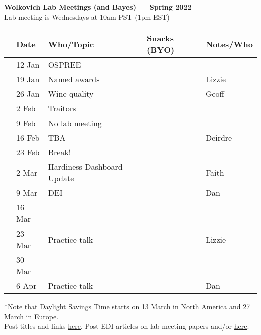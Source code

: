 \documentclass[11pt]{article}
\begin{document}
 
\raggedright
{}

\begin{center} 
{\large \textbf{Wolkovich Lab Meetings (and Bayes) --- Spring 2022}} \\ [2pt]
Lab meeting is Wednesdays at 10am PST (1pm EST) \\ %
\end{center} 

\begin{center}
\begin{tabular}{ p{0.2 cm}  p{2 cm}  p{4.5 cm}  p{3 cm}  p{3.5 cm} }  \hline \hline
 & \textbf{Date}
   & \textbf{Who/Topic}
      & \textbf{Snacks (BYO)} 
         & \textbf{Notes/Who} \\ 
\hline \hline
 &12  Jan & OSPREE &       & \\\hline
 & 19  Jan & Named awards & & Lizzie\\\hline
 & 26 Jan & Wine quality &       & Geoff\\\hline  
 & 2 Feb & Traitors &       &  \\\hline
 & 9 Feb &  No lab meeting &     &  \\\hline 
 & 16 Feb & TBA &     &Deirdre    \\\hline
 & \sout{23 Feb} & Break! &    & \\\hline
 & 2 Mar &   Hardiness Dashboard Update &     &Faith   \\\hline 
 & 9 Mar & DEI  &    & Dan  \\\hline 
 & 16 Mar &  &    &  \\\hline 
 & 23 Mar & Practice talk  &    & Lizzie \\\hline 
 & 30 Mar &  &    &  \\\hline 
 & 6 Apr & Practice talk  &    & Dan \\\hline 

\hline
\end{tabular}
\end{center}
*Note that Daylight Savings Time starts on 13 March in North America and 27 March in Europe.\\
\vspace{7pt}
 Post titles and links \href{https://docs.google.com/document/d/1j0WdDbjdp8ERLSO7whvtnP-tOblYMlX33TSCXy_uRKo/edit?usp=sharing}{\underline{here}}. Post EDI articles on lab meeting papers and/or  \href{https://docs.google.com/document/d/18VbP-03oD0BsArxYm60g1ZvvFL7IoA3-6rpdHb1eLPw/edit#heading=h.gsqcglkhxkzg}{here}.\\
\end{document}
